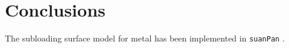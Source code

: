
\section{Conclusions}
The subloading surface model for metal has been implemented in \texttt{suanPan} \citep{Chang2022}.